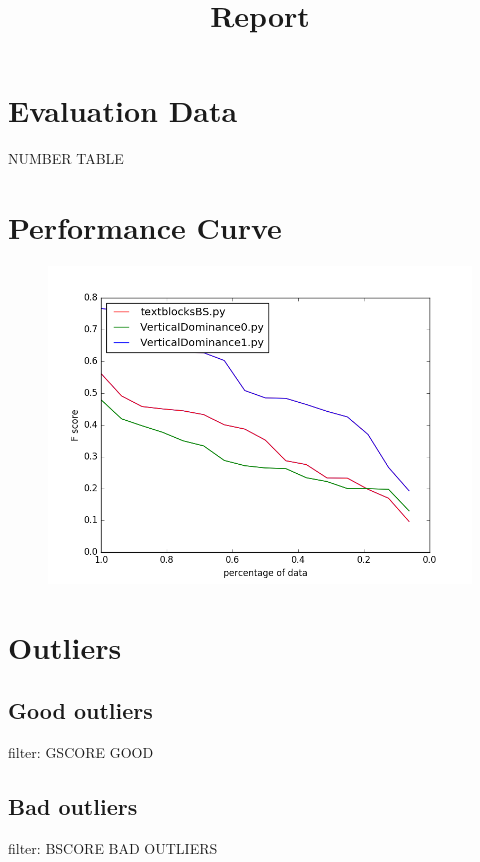 \documentclass[a4paper,10pt]{article}
\begin{document}
\title{Report}
\maketitle
\section*{Evaluation Data}
NUMBER
TABLE
\section*{Performance Curve}
\begin{figure}[!htbp]
\centering
\includegraphics[width = 15cm]{performance.png} 
\end{figure}
\section*{Outliers}
\subsection*{Good outliers}
filter: GSCORE
GOOD
\subsection*{Bad outliers}
filter: BSCORE
BAD
\newpage
OUTLIERS
\end{document}
